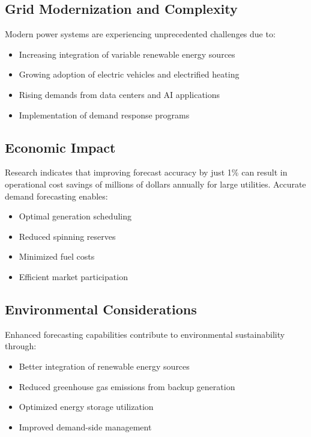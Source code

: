\documentclass[12pt,a4paper]{report}
\begin{document}
\subsection{Grid Modernization and Complexity}
Modern power systems are experiencing unprecedented challenges due to:
\begin{itemize}
\setlength{\itemsep}{0.2em}
\setlength{\parskip}{0pt}
\large
\item Increasing integration of variable renewable energy sources
\item Growing adoption of electric vehicles and electrified heating
\item Rising demands from data centers and AI applications
\item Implementation of demand response programs
\end{itemize}

\subsection{Economic Impact}
Research indicates that improving forecast accuracy by just 1\% can result in operational cost savings of millions of dollars annually for large utilities. Accurate demand forecasting enables:
\begin{itemize}
\setlength{\itemsep}{0.2em}
\setlength{\parskip}{0pt}
\large
\item Optimal generation scheduling
\item Reduced spinning reserves
\item Minimized fuel costs
\item Efficient market participation
\end{itemize}

\subsection{Environmental Considerations}
Enhanced forecasting capabilities contribute to environmental sustainability through:
\begin{itemize}
\setlength{\itemsep}{0.2em}
\setlength{\parskip}{0pt}
\large
\item Better integration of renewable energy sources
\item Reduced greenhouse gas emissions from backup generation
\item Optimized energy storage utilization
\item Improved demand-side management
\end{itemize}
\end{document}
